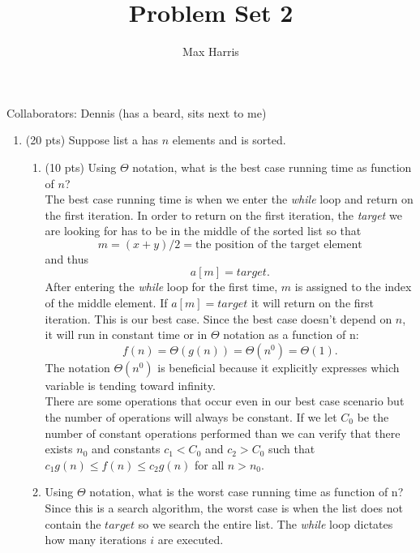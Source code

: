 \documentclass[11pt]{article}
\theoremstyle{definition}
\numberwithin{equation}{section}
\begin{document}
\title{Problem Set 2}
\author{Max Harris}

\maketitle

Collaborators: Dennis (has a beard, sits next to me)
\begin{enumerate}
	\item (20 pts) Suppose list a has $n$ elements and is sorted.
	
	\begin{enumerate}
		\item (10 pts) Using $\Theta$ notation, what is the best case running time as function of $n$?\\
		
		The best case running time is when we enter the \emph{while} loop and return on the first iteration. In order to return on the first iteration, the \emph{target} we are looking for has to be in the middle of the sorted list so that 
		$$m = (x+y)/2 = \text{the position of the target element}$$ 
		and thus 
		$$a[m] = target.$$ 
		After entering the \emph{while} loop for the first time, $m$ is assigned to the index of the middle element. If $a[m] = target$ it will return on the first iteration. This is our best case. Since the best case doesn't depend on $n$, it will run in constant time or in $\Theta$ notation as a function of n:
		$$f(n) = \Theta(g(n)) = \Theta(n^0) = \Theta(1).$$
		The notation $\Theta(n^0)$ is beneficial because it explicitly expresses which variable is tending toward infinity.\\
		There are some operations that occur even in our best case scenario but the number of operations will always be constant. If we let $C_0$ be the number of constant operations performed than we can verify that there exists $n_0$ and constants $c_1 < C_0$ and  $c_2 > C_0$ such that $c_1g(n) \leq f(n) \leq c_2g(n)$ for all $n > n_0$. \\
		
		\item Using $\Theta$ notation, what is the worst case running time as function of n?\\
		
		Since this is a search algorithm, the worst case is when the list does not contain the $target$
so we search the entire list. The \emph{while} loop dictates how many iterations $i$ are executed. 

	\end{enumerate}	
	
\end{enumerate}
\end{document}

